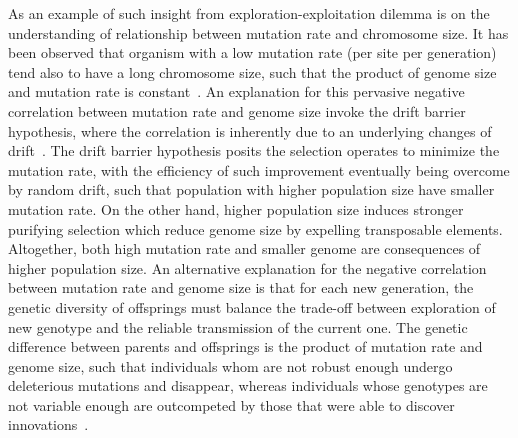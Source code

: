 As an example of such insight from exploration-exploitation dilemma is on the understanding of relationship between mutation rate and chromosome size.
It has been observed that organism with a low mutation rate (per site per generation) tend also to have a long chromosome size, such that the product of genome size and mutation rate is constant~\citep{Drake1991}.
An explanation for this pervasive negative correlation between mutation rate and genome size invoke the drift barrier hypothesis, where the correlation is inherently due to an underlying changes of \gls{drift}~\citep{Lynch2016a}.
The drift barrier hypothesis posits the selection operates to minimize the mutation rate, with the efficiency of such improvement eventually being overcome by random \gls{drift}, such that population with higher population size have smaller mutation rate.
On the other hand, higher population size induces stronger purifying selection which reduce genome size by expelling transposable elements.
Altogether, both high mutation rate and smaller genome are consequences of higher population size.
An alternative explanation for the negative correlation between mutation rate and genome size is that for each new generation, the genetic diversity of offsprings must balance the trade-off between exploration of new genotype and the reliable transmission of the current one.
The genetic difference between parents and offsprings is the product of mutation rate and genome size, such that individuals whom are not robust enough undergo deleterious mutations and disappear, whereas individuals whose genotypes are not variable enough are outcompeted by those that were able to discover innovations~\citep{Knibbe2007, Beslon2010, Hindre2012, Batut2014, Biller2016}.
